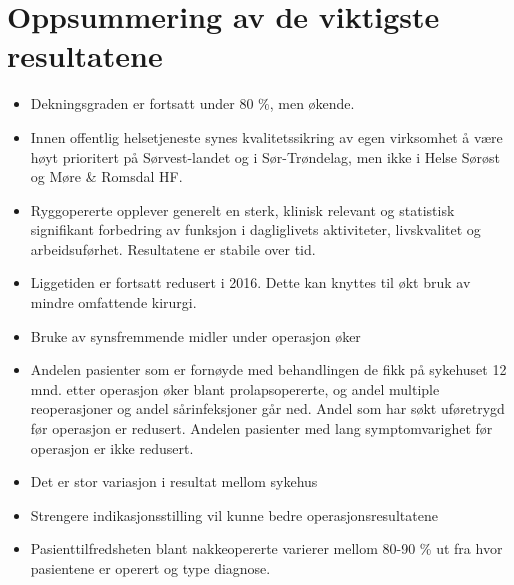 \documentclass [norsk,a4paper,twoside]{article}\usepackage[]{graphicx}\usepackage[]{color}
\begin{document}
\section{Oppsummering av de viktigste resultatene}

\begin{itemize}
      \item Dekningsgraden er fortsatt under 80 \%, men økende.
      \item Innen offentlig helsetjeneste synes kvalitetssikring av egen virksomhet å
      være høyt prioritert på Sørvest-landet og i Sør-Trøndelag, men ikke i Helse
      Sørøst og Møre & Romsdal HF.
      \item Ryggopererte opplever generelt en sterk, klinisk relevant og statistisk
      signifikant forbedring av funksjon i dagliglivets aktiviteter, livskvalitet og
      arbeidsuførhet. Resultatene er stabile over tid.
      \item Liggetiden er fortsatt redusert i 2016. Dette kan knyttes til økt bruk av
      mindre omfattende kirurgi.
      \item Bruke av synsfremmende midler under operasjon øker
      \item Andelen pasienter som er fornøyde med behandlingen de fikk på sykehuset
      12 mnd. etter operasjon øker blant prolapsopererte, og andel multiple
      reoperasjoner og andel sårinfeksjoner går ned. Andel som har søkt
      uføretrygd før operasjon er redusert. Andelen pasienter med lang
      symptomvarighet før operasjon er ikke redusert.
      \item Det er stor variasjon i resultat mellom sykehus
      \item Strengere indikasjonsstilling vil kunne bedre operasjonsresultatene
      \item Pasienttilfredsheten blant nakkeopererte varierer mellom 80-90 \% ut fra
      hvor pasientene er operert og type diagnose.
\end{itemize}
\end{document}
